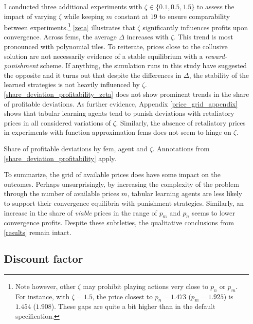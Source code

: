 I conducted three additional experiments with $\zeta \in \{0.1, 0.5, 1.5\}$ to assess the impact of varying $\zeta$ while keeping $m$ constant at $19$ to ensure comparability between experiments.\footnote{Note however, other $\zeta$ may prohibit playing actions very close to $p_n$ or $p_m$. For instance, with $\zeta = 1.5$, the price closest to $p_n = 1.473$ ($p_m = 1.925$) is $1.454$ ($1.908$). These gaps are quite a bit higher than in the default specification.} \autoref{zeta} illustrates that $\zeta$ significantly influences profits upon convergence. Across \gls{fem}s, the average $\Delta$ increases with $\zeta$. This trend is most pronounced with polynomial tiles. To reiterate, prices close to the collusive solution are not necessarily evidence of a stable equilibrium with a \emph{reward-punishment} scheme. If anything, the simulation runs in this study have suggested the opposite and it turns out that despite the differences in $\Delta$, the stability of the learned strategies is not heavily influenced by $\zeta$. \autoref{share_deviation_profitability_zeta} does not show prominent trends in the share of profitable deviations. As further evidence, Appendix \ref{price_grid_appendix} shows that tabular learning agents tend to punish deviations with retaliatory prices in all considered variations of $\zeta$. Similarly, the absence of retaliatory prices in experiments with function approximation \gls{fem}s does not seem to hinge on $\zeta$.

\begin{table}
	\centering
	
	\caption[Share of profitable deviations by \gls{fem}, agent and $\zeta$]{Share of profitable deviations by \gls{fem}, agent and $\zeta$. Annotations from \autoref{share_deviation_profitability} apply.}
	\label{share_deviation_profitability_zeta}
\end{table}

To summarize, the grid of available prices does have some impact on the outcomes. Perhaps unsurprisingly, by increasing the complexity of the problem through the number of available prices $m$, tabular learning agents are less likely to support their convergence equilibria with punishment strategies. Similarly, an increase in the share of \emph{viable} prices in the range of $p_m$ and $p_n$ seems to lower convergence profits. Despite these subtleties, the qualitative conclusions from \autoref{results} remain intact.

\subsection{Discount factor}\label{discounting}

